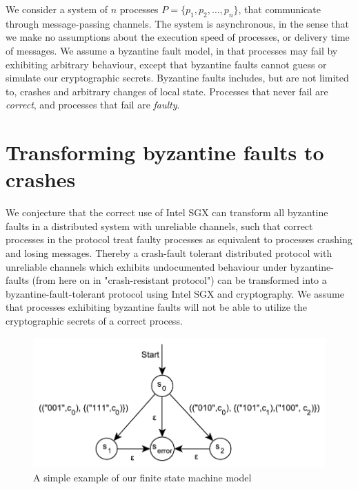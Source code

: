 \documentclass{article}
\begin{document}
	We consider a system of $n$ processes $P=\{p_1, p_2, \dots, p_n\}$, that communicate through message-passing channels.
	The system is asynchronous, in the sense that we make no assumptions about the execution speed of processes, or delivery time of messages.
	We assume a byzantine fault model, in that processes may fail by exhibiting arbitrary behaviour, except	that byzantine faults cannot guess or simulate our cryptographic secrets.
	Byzantine faults includes, but are not limited to, crashes and arbitrary changes of local state.
	Processes that never fail are \textit{correct}, and processes that fail are \textit{faulty}.

	\section{Transforming byzantine faults to crashes}
	\label{sec:transforming-byzantine-faults}

	We conjecture that the correct use of Intel SGX can transform all byzantine faults in a distributed system with unreliable channels, such that correct processes in the protocol treat faulty processes as equivalent to processes crashing and losing messages.
	Thereby a crash-fault tolerant distributed protocol with unreliable channels which exhibits undocumented behaviour under byzantine-faults (from here on in "crash-resistant protocol") can be transformed into a byzantine-fault-tolerant protocol using Intel SGX and cryptography.
	We assume that processes exhibiting byzantine faults will not be able to utilize the cryptographic secrets of a correct process.

	\begin{figure}[!ht]
		\center
		\includegraphics[scale=0.6]{figures/state-machines/simple-NFA.pdf}
		\caption{A simple example of our finite state machine model\label{fig:simple-nfa}}
	\end{figure}
\end{document}
